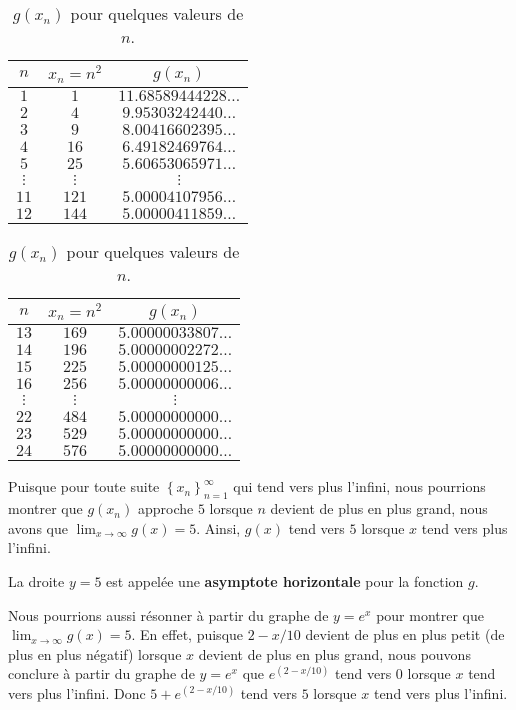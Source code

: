 {\begin{egg}
\begin{table}
\begin{center}
\begin{tabular}{c|c|c}
\hline
$n$ & $x_n = n^2$ & $g(x_n)$ \\ 
\hline
$1$ & $1$ & $11.68589444228\ldots$ \\ 
$2$ & $4$ & $9.95303242440\ldots$ \\ 
$3$ & $9$ & $8.00416602395\ldots$ \\ 
$4$ & $16$ & $6.49182469764\ldots$ \\ 
$5$ & $25$ & $5.60653065971\ldots$ \\ 
$\vdots$ & $\vdots$ & $\vdots$ \\ 
$11$ & $121$ & $5.00004107956\ldots$ \\ 
$12$ & $144$ & $5.00000411859\ldots$ \\ 
\hline
\end{tabular}
\qquad
\begin{tabular}{c|c|c}
\hline
$n$ & $x_n = n^2$ & $g(x_n)$ \\ 
\hline
$13$ & $169$ & $5.00000033807\ldots$ \\ 
$14$ & $196$ & $5.00000002272\ldots$ \\ 
$15$ & $225$ & $5.00000000125\ldots$ \\ 
$16$ & $256$ & $5.00000000006\ldots$ \\ 
$\vdots$ & $\vdots$ & $\vdots$ \\
$22$ & $484$ & $5.00000000000\ldots$ \\ 
$23$ & $529$ & $5.00000000000\ldots$ \\ 
$24$ & $576$ & $5.00000000000\ldots$ \\ 
\hline
\end{tabular}
\caption[Limite à l'infini d'une fonction]{$g(x_n)$ pour quelques
  valeurs de $n$. \label{TAB_LIM_INF}}
\end{center}
\end{table}

Puisque pour toute suite
$\displaystyle \left\{ x_n \right\}_{n=1}^\infty$
qui tend vers plus l'infini, nous pourrions montrer que $g(x_n)$ approche
$5$ lorsque $n$ devient de plus en plus grand, nous avons que
$\displaystyle \lim_{x\rightarrow \infty} g(x) = 5$.  Ainsi, $g(x)$
tend vers $5$ lorsque $x$ tend vers plus l'infini.

La droite $y=5$ est appelée une {\bfseries asymptote horizontale} pour
la fonction $g$.

Nous pourrions aussi résonner à partir du graphe de $y=e^x$ pour montrer
que $\displaystyle \lim_{x\rightarrow \infty} g(x) = 5$.  En effet,
puisque $\displaystyle 2- x/10$ devient de plus en plus petit
(de plus en plus \lgm négatif\rgm) lorsque $x$ devient de plus en plus
grand, nous pouvons conclure à partir du graphe de $y=e^x$ que
$\displaystyle e^{\left(2- x/10\right)}$ tend vers $0$ lorsque
$x$ tend vers plus l'infini.  Donc
$\displaystyle 5+e^{\left(2- x/10\right)}$ tend vers $5$ lorsque
$x$ tend vers plus l'infini.
\label{asympt5}
\end{egg}

}
